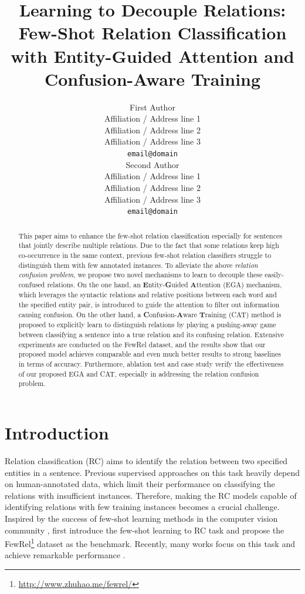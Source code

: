 \documentclass[11pt]{article}
\title{Learning to Decouple Relations: Few-Shot Relation Classification with Entity-Guided Attention and Confusion-Aware Training 
}
\author{First Author \\
  Affiliation / Address line 1 \\
  Affiliation / Address line 2 \\
  Affiliation / Address line 3 \\
  {\tt email@domain} \\\And
  Second Author \\
  Affiliation / Address line 1 \\
  Affiliation / Address line 2 \\
  Affiliation / Address line 3 \\
  {\tt email@domain} \\}
\date{}
\begin{document}
\maketitle
\begin{abstract}
This paper aims to enhance the few-shot relation classification especially for sentences that jointly describe multiple relations.
Due to the fact that some relations keep high co-occurrence in the same context,
previous few-shot relation classifiers struggle to distinguish them with few annotated instances.
To alleviate the above \textit{relation confusion problem}, we propose two novel mechanisms to learn to decouple these easily-confused relations.
On the one hand, an \textbf{E}ntity-\textbf{G}uided \textbf{A}ttention (EGA) mechanism, which leverages the syntactic relations and relative positions between each word and the specified entity pair, is introduced to guide the attention to filter out information causing confusion.
On the other hand, a \textbf{C}onfusion-\textbf{A}ware \textbf{T}raining (CAT) method is proposed to explicitly learn to distinguish relations by playing a pushing-away game between classifying a sentence into a true relation and its confusing relation.
Extensive experiments are conducted on the FewRel dataset, and the results show that our proposed model achieves comparable and even much better results to strong baselines in terms of accuracy.
Furthermore, ablation test and case study verify the effectiveness of our proposed EGA and CAT, especially in addressing the relation confusion problem.


\end{abstract}

\section{Introduction}


Relation classification (RC) aims to identify the relation between two specified entities in a sentence. 
Previous supervised approaches on this task heavily depend on human-annotated data, which limit their performance on classifying the relations with insufficient instances.
Therefore, making the RC models capable of identifying relations with few training instances becomes a crucial challenge.
Inspired by the success of few-shot learning methods in the computer vision community  \cite{Vinyals2016Matching,Sung1711,SantoroBBWL16},  first introduce the few-shot learning to RC task and propose the FewRel\footnote{\url{http://www.zhuhao.me/fewrel/}} dataset as the benchmark.
Recently, many works focus on this task and achieve remarkable performance \cite{gao2019hybrid,snell2017prototypical,YeMulti}. 
\end{document}
